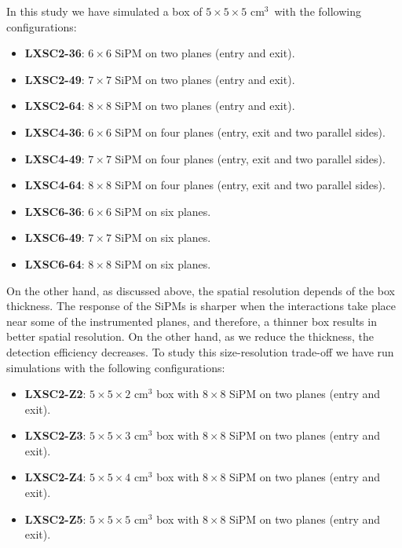 In this study we have simulated a box of $5\times5\times5$ cm$^3$~with the following configurations: 

\begin{itemize}
\item \textbf{LXSC2-36}:  $6\times6$ SiPM on two planes (entry and exit).
\item \textbf{LXSC2-49}:  $7\times7$ SiPM on two planes (entry and exit).
\item \textbf{LXSC2-64}:  $8\times8$ SiPM on two planes (entry and exit).

\item \textbf{LXSC4-36}:  $6\times6$ SiPM on four planes (entry, exit and two parallel sides).
\item \textbf{LXSC4-49}:  $7\times7$ SiPM on four planes (entry, exit and two parallel sides).
\item \textbf{LXSC4-64}:  $8\times8$ SiPM on four planes (entry, exit and two parallel sides).

\item \textbf{LXSC6-36}:  $6\times6$ SiPM on six planes.
\item \textbf{LXSC6-49}:  $7\times7$ SiPM on six planes.
\item \textbf{LXSC6-64}:  $8\times8$ SiPM on six planes.
\end{itemize}

On the other hand, as discussed above, the spatial resolution depends of the box thickness. The response of the SiPMs is sharper when the interactions take place near some of the instrumented planes, and therefore, a thinner box results in better spatial resolution. On the other hand, as we reduce the thickness, the detection efficiency decreases.  To study this size-resolution trade-off we have run simulations with the following configurations:

\begin{itemize}
\item \textbf{LXSC2-Z2}:  $5\times5\times2$ cm$^3$ box with $8\times8$ SiPM on two planes (entry and exit).
\item \textbf{LXSC2-Z3}:  $5\times5\times3$ cm$^3$ box with $8\times8$ SiPM on two planes (entry and exit).
\item \textbf{LXSC2-Z4}:  $5\times5\times4$ cm$^3$ box with $8\times8$ SiPM on two planes (entry and exit).
\item \textbf{LXSC2-Z5}:  $5\times5\times5$ cm$^3$ box with $8\times8$ SiPM on two planes (entry and exit).
\end{itemize}

